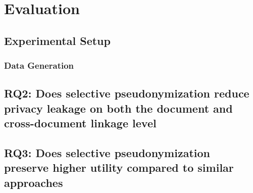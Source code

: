 \chapter{Evaluation}\label{chapter:evaluation}
\section{Experimental Setup}
\subsection{Data Generation}\label{subsec:datagen}
\subsection{}
\section{RQ2: Does selective pseudonymization reduce privacy leakage on both the document and cross-document linkage level}
\section{RQ3: Does selective pseudonymization preserve higher utility compared to similar approaches}